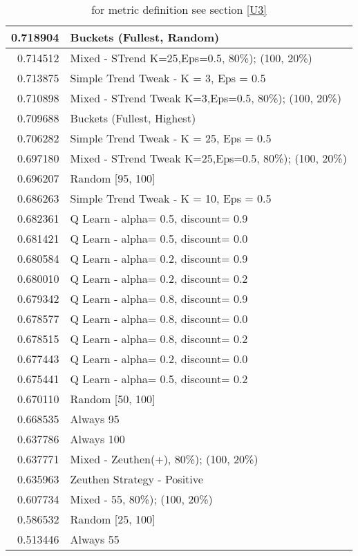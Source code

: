 \begin{table}[!hbtp]
\begin{footnotesize}
\begin{tabular}{|r|l|}
0.718904 & Buckets (Fullest, Random)\\ \hline
0.714512 & Mixed - {STrend K=25,Eps=0.5, 80\%); (100, 20\%)}\\ \hline
0.713875 & Simple Trend Tweak - K = 3, Eps = 0.5\\ \hline
0.710898 & Mixed - {STrend Tweak K=3,Eps=0.5, 80\%); (100, 20\%)}\\ \hline
0.709688 & Buckets (Fullest, Highest)\\ \hline
0.706282 & Simple Trend Tweak - K = 25, Eps = 0.5\\ \hline
0.697180 & Mixed - {STrend Tweak K=25,Eps=0.5, 80\%); (100, 20\%)}\\ \hline
0.696207 & Random [95, 100]\\ \hline
0.686263 & Simple Trend Tweak - K = 10, Eps = 0.5\\ \hline
0.682361 & Q Learn - alpha= 0.5, discount= 0.9\\ \hline
0.681421 & Q Learn - alpha= 0.5, discount= 0.0\\ \hline
0.680584 & Q Learn - alpha= 0.2, discount= 0.9\\ \hline
0.680010 & Q Learn - alpha= 0.2, discount= 0.2\\ \hline
0.679342 & Q Learn - alpha= 0.8, discount= 0.9\\ \hline
0.678577 & Q Learn - alpha= 0.8, discount= 0.0\\ \hline
0.678515 & Q Learn - alpha= 0.8, discount= 0.2\\ \hline
0.677443 & Q Learn - alpha= 0.2, discount= 0.0\\ \hline
0.675441 & Q Learn - alpha= 0.5, discount= 0.2\\ \hline
0.670110 & Random [50, 100]\\ \hline
0.668535 & Always 95\\ \hline
0.637786 & Always 100\\ \hline
0.637771 & Mixed - {Zeuthen(+), 80\%); (100, 20\%)}\\ \hline
0.635963 & Zeuthen Strategy - Positive\\ \hline
0.607734 & Mixed - {55, 80\%); (100, 20\%)}\\ \hline
0.586532 & Random [25, 100]\\ \hline
0.513446 & Always 55\\ \hline
\end{tabular}
\caption{for metric definition see section \eqref{U3}}
\end{footnotesize}
\end{table}

